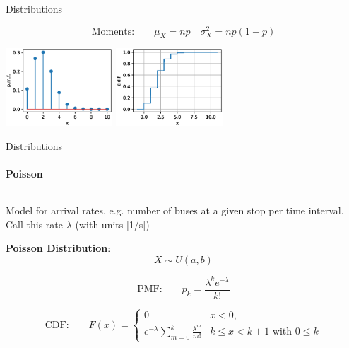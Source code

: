 {\begin{frame}{Distributions}
\begin{boxed}
            $$\text{Moments:}\qquad \displaystyle \mu_X = np \quad \sigma_X^2 = np(1-p)$$
        \end{boxed}
        \vspace*{-3mm}
        \begin{center}
            \includegraphics[width=0.3\textwidth]{fig/prob_binomial_pdf.eps}
            \qquad
            \includegraphics[width=0.3\textwidth]{fig/prob_binomial_cdf.eps}
        \end{center}

    \end{frame}

    \begin{frame}{Distributions}
        \framesubtitle{{Poisson}}
        \vspace*{-8mm}
        \begin{columns}[onlytextwidth]
            \begin{column}{0.57\textwidth}
                Model for arrival rates, e.g. number of buses at a given stop per
                time interval. Call this rate $\lambda$ (with units [1/s])
                \vspace*{2mm}

                \begin{boxed}
                    \textbf{Poisson Distribution}:
                    $$X \sim U(a, b)$$

                    $$\text{PMF:}\qquad p_k = \frac{\lambda^ke^{-\lambda}}{k!}$$

                    $$\text{CDF:}\qquad F(x) = \begin{cases} 0 & x < 0, \\ e^{-\lambda}\sum_{m = 0}^k \frac{\lambda^m}{m!} & k \le x < k+1 \text{ with } 0 \le k \end{cases}$$


\end{boxed}
\end{column}
\end{columns}
\end{frame}}
